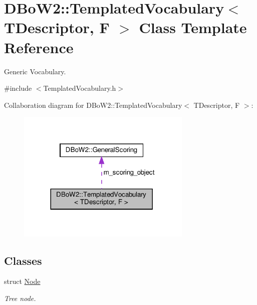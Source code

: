 \hypertarget{classDBoW2_1_1TemplatedVocabulary}{}\section{D\+Bo\+W2\+:\+:Templated\+Vocabulary$<$ T\+Descriptor, F $>$ Class Template Reference}
\label{classDBoW2_1_1TemplatedVocabulary}


Generic Vocabulary.  




{\ttfamily \#include $<$Templated\+Vocabulary.\+h$>$}



Collaboration diagram for D\+Bo\+W2\+:\+:Templated\+Vocabulary$<$ T\+Descriptor, F $>$\+:\nopagebreak
\begin{figure}[H]
\begin{center}
\leavevmode
\includegraphics[width=236pt]{classDBoW2_1_1TemplatedVocabulary__coll__graph}
\end{center}
\end{figure}
\subsection*{Classes}
\begin{DoxyCompactItemize}
\item 
struct \hyperlink{structDBoW2_1_1TemplatedVocabulary_1_1Node}{Node}
\begin{DoxyCompactList}\small\item\em Tree node. \end{DoxyCompactList}\end{DoxyCompactItemize}
